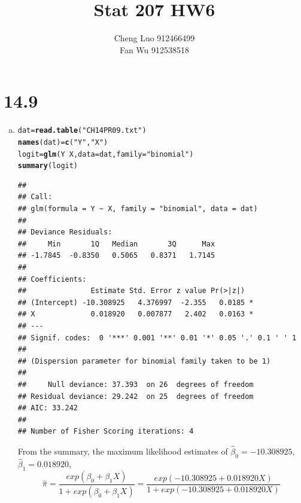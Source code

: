 \documentclass{article}\usepackage[]{graphicx}\usepackage[]{color}
\makeatletter
\newcommand{\hlstr}[1]{\textcolor[rgb]{0.192,0.494,0.8}{#1}}%
\newcommand{\hlopt}[1]{\textcolor[rgb]{0,0,0}{#1}}%
\newcommand{\hlstd}[1]{\textcolor[rgb]{0.345,0.345,0.345}{#1}}%
\newcommand{\hlkwb}[1]{\textcolor[rgb]{0.69,0.353,0.396}{#1}}%
\newcommand{\hlkwc}[1]{\textcolor[rgb]{0.333,0.667,0.333}{#1}}%
\newcommand{\hlkwd}[1]{\textcolor[rgb]{0.737,0.353,0.396}{\textbf{#1}}}%
\newenvironment{kframe}{%
 \def\at@end@of@kframe{}%
 \ifinner\ifhmode%
  \def\at@end@of@kframe{\end{minipage}}%
  \begin{minipage}{\columnwidth}%
 \fi\fi%
 \def\FrameCommand##1{\hskip\@totalleftmargin \hskip-\fboxsep
 \colorbox{shadecolor}{##1}\hskip-\fboxsep
     \hskip-\linewidth \hskip-\@totalleftmargin \hskip\columnwidth}%
 \MakeFramed {\advance\hsize-\width
   \@totalleftmargin\z@ \linewidth\hsize
   \@setminipage}}%
 {\par\unskip\endMakeFramed%
 \at@end@of@kframe}
\newenvironment{knitrout}{}{} %
\makeatother
\begin{document}
\title{\huge \textbf{Stat 207 HW6} \\}
\author{\large Cheng Luo 912466499 \\ \large Fan Wu 912538518}
\maketitle

\newpage
\mbox{}
\newpage

\section{14.9}

\begin{enumerate}[(a)]

\item

\begin{knitrout}
\color{fgcolor}\begin{kframe}
\begin{alltt}
  \hlstd{dat} \hlkwb{=} \hlkwd{read.table}\hlstd{(}\hlstr{"CH14PR09.txt"}\hlstd{)}
  \hlkwd{names}\hlstd{(dat)} \hlkwb{=} \hlkwd{c}\hlstd{(}\hlstr{"Y"}\hlstd{,} \hlstr{"X"}\hlstd{)}
  \hlstd{logit} \hlkwb{=} \hlkwd{glm}\hlstd{(Y} \hlopt{~} \hlstd{X,} \hlkwc{data} \hlstd{= dat,} \hlkwc{family} \hlstd{=} \hlstr{"binomial"}\hlstd{)}
  \hlkwd{summary}\hlstd{(logit)}
\end{alltt}
\begin{verbatim}
## 
## Call:
## glm(formula = Y ~ X, family = "binomial", data = dat)
## 
## Deviance Residuals: 
##     Min       1Q   Median       3Q      Max  
## -1.7845  -0.8350   0.5065   0.8371   1.7145  
## 
## Coefficients:
##               Estimate Std. Error z value Pr(>|z|)  
## (Intercept) -10.308925   4.376997  -2.355   0.0185 *
## X             0.018920   0.007877   2.402   0.0163 *
## ---
## Signif. codes:  0 '***' 0.001 '**' 0.01 '*' 0.05 '.' 0.1 ' ' 1
## 
## (Dispersion parameter for binomial family taken to be 1)
## 
##     Null deviance: 37.393  on 26  degrees of freedom
## Residual deviance: 29.242  on 25  degrees of freedom
## AIC: 33.242
## 
## Number of Fisher Scoring iterations: 4
\end{verbatim}
\end{kframe}
\end{knitrout}

\qquad From the summary, the maximum likelihood estimates of $\hat{\beta}_0 = -10.308925$, $\hat{\beta}_1 = 0.018920$, $$\hat{\pi} = \frac{exp(\beta_0+\beta_1 X)}{1+exp(\beta_0+\beta_1 X)}=\frac{exp(-10.308925+0.018920 X)}{1+exp(-10.308925+0.018920 X)}$$


\end{enumerate}
\end{document}
